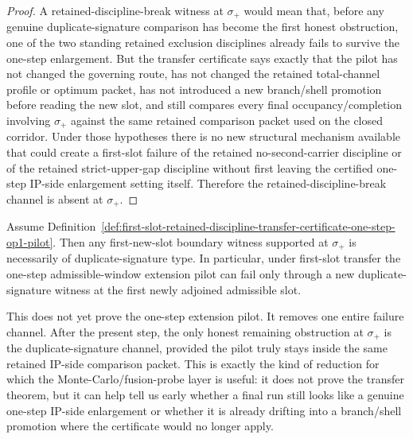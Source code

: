 \begin{proof}
A retained-discipline-break witness at $\sigma_{+}$ would mean that, before any genuine duplicate-signature comparison has become the first honest obstruction, one of the two standing retained exclusion disciplines already fails to survive the one-step enlargement. But the transfer certificate says exactly that the pilot has not changed the governing route, has not changed the retained total-channel profile or optimum packet, has not introduced a new branch/shell promotion before reading the new slot, and still compares every final occupancy/completion involving $\sigma_{+}$ against the same retained comparison packet used on the closed corridor. Under those hypotheses there is no new structural mechanism available that could create a first-slot failure of the retained no-second-carrier discipline or of the retained strict-upper-gap discipline without first leaving the certified one-step IP-side enlargement setting itself. Therefore the retained-discipline-break channel is absent at $\sigma_{+}$.
\end{proof}

\begin{corollary}
\label{cor:under-first-slot-transfer-boundary-witness-at-sigma-plus-is-duplicate-signature-type}
Assume Definition~\ref{def:first-slot-retained-discipline-transfer-certificate-one-step-op1-pilot}. Then any first-new-slot boundary witness supported at $\sigma_{+}$ is necessarily of duplicate-signature type. In particular, under first-slot transfer the one-step admissible-window extension pilot can fail only through a new duplicate-signature witness at the first newly adjoined admissible slot.
\end{corollary}

\begin{remark}
\label{rem:what-first-slot-retained-discipline-transfer-buys}
This does not yet prove the one-step extension pilot. It removes one entire failure channel. After the present step, the only honest remaining obstruction at $\sigma_{+}$ is the duplicate-signature channel, provided the pilot truly stays inside the same retained IP-side comparison packet. This is exactly the kind of reduction for which the Monte-Carlo/fusion-probe layer is useful: it does not prove the transfer theorem, but it can help tell us early whether a final run still looks like a genuine one-step IP-side enlargement or whether it is already drifting into a branch/shell promotion where the certificate would no longer apply.
\end{remark}


